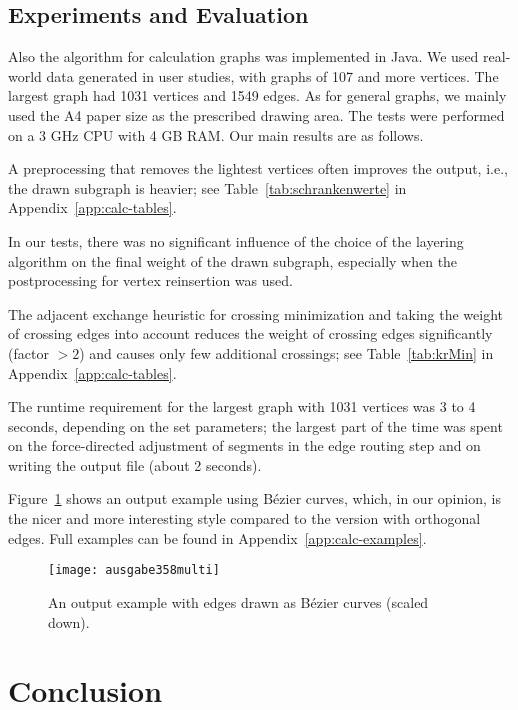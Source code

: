 \documentclass[]{llncs}
\begin{document}
\subsection{Experiments and Evaluation}
Also the algorithm for calculation graphs was implemented in Java. We
used real-world data generated in user studies, with graphs of 107 and
more vertices. The largest graph had 1031 vertices and 1549 edges. As
for general graphs, we mainly used the A4 paper size as the prescribed
drawing area. The tests were performed on a 3 GHz CPU with 4 GB RAM.
Our main results are as follows.
\begin{compactitem}
  \item A preprocessing that removes the lightest vertices often
		improves the output, i.e., the drawn subgraph is heavier; see
		Table~\ref{tab:schrankenwerte} in Appendix~\ref{app:calc-tables}.
  \item In our tests, there was no significant influence of the choice
    of the layering algorithm on the final weight of the drawn
    subgraph, especially when the postprocessing for vertex
    reinsertion was used.
  \item The adjacent exchange heuristic for crossing
    minimization and taking the weight of crossing edges into
    account reduces the weight of crossing edges significantly
    (factor $> 2$) and causes only few additional crossings; see
    Table~\ref{tab:krMin} in Appendix~\ref{app:calc-tables}.
  \item The runtime requirement for the largest graph with 1031
    vertices was 3 to 4 seconds, depending on the set parameters; the
    largest part of the time was spent on the force-directed adjustment
    of segments in the edge routing step and on writing the output
    file (about 2 seconds).
\end{compactitem}

Figure~\ref{fig:calc-output-bezier-scaled} shows an output example
using B\'ezier curves, which, in our opinion, is the nicer and more
interesting style compared to the version with orthogonal edges. 
Full examples can be found in Appendix~\ref{app:calc-examples}.
\begin{figure}[tb]
  \centering
  \texttt{[image: ausgabe358multi]}
  \caption{An output example with edges drawn as B\'ezier curves
  (scaled down).}
  \label{fig:calc-output-bezier-scaled}
\end{figure}

\section{Conclusion}
\end{document}
